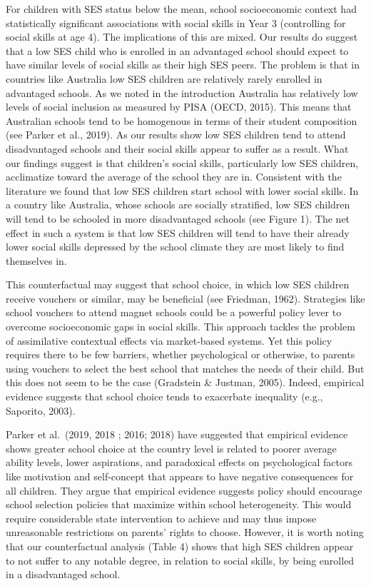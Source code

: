\documentclass[
  english,
  man]{apa6}
\begin{document}
For children with SES status below the mean, school socioeconomic context had statistically significant associations with social skills in Year 3 (controlling for social skills at age 4). The implications of this are mixed. Our results do suggest that a low SES child who is enrolled in an advantaged school should expect to have similar levels of social skills as their high SES peers. The problem is that in countries like Australia low SES children are relatively rarely enrolled in advantaged schools. As we noted in the introduction Australia has relatively low levels of social inclusion as measured by PISA (OECD, 2015). This means that Australian schools tend to be homogenous in terms of their student composition (see Parker et al., 2019). As our results show low SES children tend to attend disadvantaged schools and their social skills appear to suffer as a result. What our findings suggest is that children's social skills, particularly low SES children, acclimatize toward the average of the school they are in. Consistent with the literature we found that low SES children start school with lower social skills. In a country like Australia, whose schools are socially stratified, low SES children will tend to be schooled in more disadvantaged schools (see Figure 1). The net effect in such a system is that low SES children will tend to have their already lower social skills depressed by the school climate they are most likely to find themselves in.

This counterfactual may suggest that school choice, in which low SES children receive vouchers or similar, may be beneficial (see Friedman, 1962). Strategies like school vouchers to attend magnet schools could be a powerful policy lever to overcome socioeconomic gaps in social skills. This approach tackles the problem of assimilative contextual effects via market-based systems. Yet this policy requires there to be few barriers, whether psychological or otherwise, to parents using vouchers to select the best school that matches the needs of their child. But this does not seem to be the case (Gradstein \& Justman, 2005). Indeed, empirical evidence suggests that school choice tends to exacerbate inequality (e.g., Saporito, 2003).

Parker et al.~(2019, 2018 ; 2016; 2018) have suggested that empirical evidence shows greater school choice at the country level is related to poorer average ability levels, lower aspirations, and paradoxical effects on psychological factors like motivation and self-concept that appears to have negative consequences for all children. They argue that empirical evidence suggests policy should encourage school selection policies that maximize within school heterogeneity. This would require considerable state intervention to achieve and may thus impose unreasonable restrictions on parents' rights to choose. However, it is worth noting that our counterfactual analysis (Table 4) shows that high SES children appear to not suffer to any notable degree, in relation to social skills, by being enrolled in a disadvantaged school.
\end{document}
